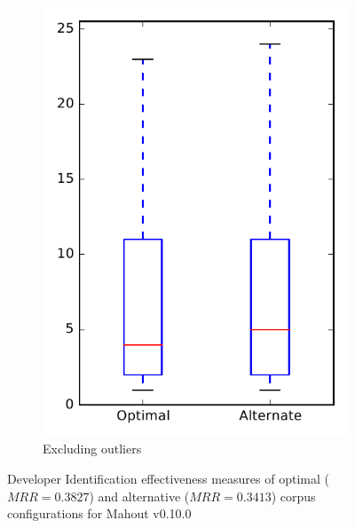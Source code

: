 \begin{figure}
\begin{subfigure}{.4\textwidth}
        \includegraphics[height=0.4\textheight]{figures/combo/dit_rq2_mahout_no_outlier}
        \caption{Excluding outliers}\label{fig:combo:dit:rq2:mahout_no_outlier}
    \end{subfigure}
\caption{Developer Identification effectiveness measures of optimal ($MRR=0.3827$) and alternative ($MRR=0.3413$) corpus configurations for Mahout v0.10.0}
\label{fig:combo:dit:rq2:mahout}
\end{figure}
